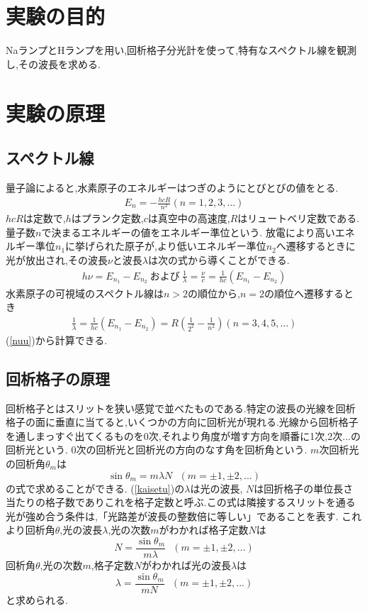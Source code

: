 \documentclass[a4j,10pt]{jarticle}
\begin{document}
  \section{実験の目的}
  NaランプとHランプを用い,回析格子分光計を使って,特有なスペクトル線を観測し,その波長を求める.
  \section{実験の原理}
  \subsection{スペクトル線}
  量子論によると,水素原子のエネルギーはつぎのようにとびとびの値をとる.
  \begin{eqnarray}
    \label{h}
    E_n = - \frac{hcR}{n^2} (n = 1,2,3,...)
  \end{eqnarray}
  $hcR$は定数で,$h$はプランク定数,$c$は真空中の高速度,$R$はリュートベリ定数である.量子数$n$で決まるエネルギーの値をエネルギー準位という.
  放電により高いエネルギー準位$n_1$に挙げられた原子が,より低いエネルギー準位$n_2$へ遷移するときに光が放出され,その波長$\nu$と波長$\lambda$は次の式から導くことができる.
  \begin{eqnarray}
    \label{nu}
    h\nu = E_{n_1}-E_{n_2} \ および \ \frac{1}{\lambda} = \frac{\nu}{c} = \frac{1}{hc}(E_{n_1} - E_{n_2})
  \end{eqnarray}
  水素原子の可視域のスペクトル線は$n>2$の順位から,$n=2$の順位へ遷移するとき
  \begin{eqnarray}
    \label{nuu}
    \frac{1}{\lambda} = \frac{1}{hc}(E_{n_1} - E_{n_2}) = R\left( \frac{1}{2^2} - \frac{1}{n^2} \right) (n=3,4,5,...)
  \end{eqnarray}
  (\ref{nuu})から計算できる.
  \subsection{回析格子の原理}
  回析格子とはスリットを狭い感覚で並べたものである.特定の波長の光線を回析格子の面に垂直に当てると,いくつかの方向に回析光が現れる.光線から回析格子を通しまっすぐ出てくるものを0次,それより角度が増す方向を順番に1次,2次...の回析光という.
  0次の回析光と回析光の方向のなす角を回析角という.
  $m$次回析光の回析角$\theta_m$は
  \begin{equation}
    \label{kaisetu}
    \sin \theta_m = m \lambda N \ \ \ (m=\pm 1 , \pm 2 , ...)
  \end{equation}
  の式で求めることができる.
  (\ref{kaisetu})の$\lambda$は光の波長, $N$は回折格子の単位長さ当たりの格子数でありこれを格子定数と呼ぶ.この式は隣接するスリットを通る光が強め合う条件は,「光路差が波長の整数倍に等しい」であることを表す.
  これより回析角$\theta$,光の波長$\lambda$,光の次数$m$がわかれば格子定数$N$は
  \begin{equation}
    \label{N}
     N =\frac{\sin \theta_m}{m \lambda} \ \ \ (m=\pm 1 , \pm 2 , ...)
  \end{equation}
  回析角$\theta$,光の次数$m$,格子定数$N$がわかれば光の波長$\lambda$は
  \begin{equation}
    \label{lamda}
    \lambda = \frac{\sin \theta_m}{m N} \ \ \ (m=\pm 1 , \pm 2 , ...)
  \end{equation}
  と求められる.
\end{document}
